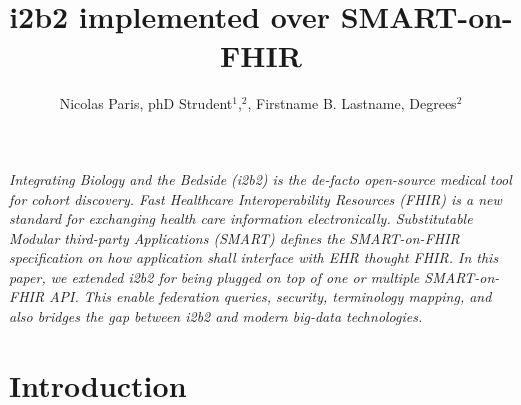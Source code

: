 \documentclass{amia}
\begin{document}
\title{i2b2 implemented over SMART-on-FHIR} 
\author{Nicolas Paris, phD Strudent$^{1}$,$^{2}$, Firstname B. Lastname, Degrees$^{2}$}


\maketitle


\textit{Integrating Biology and the Bedside (i2b2) is the de-facto open-source medical tool for cohort discovery. Fast Healthcare Interoperability Resources (FHIR) is a new standard for exchanging health care information electronically. Substitutable Modular third-party Applications (SMART) defines the SMART-on-FHIR specification on how application shall interface with EHR thought FHIR. In this paper, we extended i2b2 for being plugged on top of one or multiple SMART-on-FHIR API. This enable federation queries, security, terminology mapping, and also bridges the gap between i2b2 and modern big-data technologies.}

\section*{Introduction}
\end{document}
